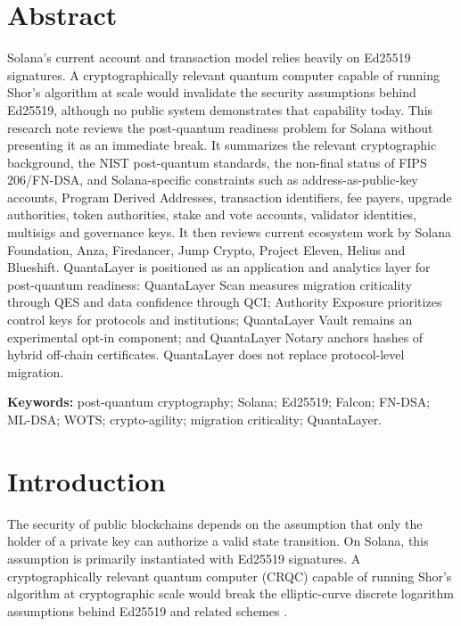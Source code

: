 \documentclass[11pt,a4paper,oneside,parskip=false]{scrartcl}
\newcommand{\QES}{\textsc{QES}}
\newcommand{\QCI}{\textsc{QCI}}
\begin{document}
\clearpage

\section*{Abstract}
{
\small
\noindent
Solana's current account and transaction model relies heavily on Ed25519 signatures. A cryptographically relevant quantum computer capable of running Shor's algorithm at scale would invalidate the security assumptions behind Ed25519, although no public system demonstrates that capability today. This research note reviews the post-quantum readiness problem for Solana without presenting it as an immediate break. It summarizes the relevant cryptographic background, the NIST post-quantum standards, the non-final status of FIPS 206/FN-DSA, and Solana-specific constraints such as address-as-public-key accounts, Program Derived Addresses, transaction identifiers, fee payers, upgrade authorities, token authorities, stake and vote accounts, validator identities, multisigs and governance keys. It then reviews current ecosystem work by Solana Foundation, Anza, Firedancer, Jump Crypto, Project Eleven, Helius and Blueshift. QuantaLayer is positioned as an application and analytics layer for post-quantum readiness: QuantaLayer Scan measures migration criticality through \QES{} and data confidence through \QCI{}; Authority Exposure prioritizes control keys for protocols and institutions; QuantaLayer Vault remains an experimental opt-in component; and QuantaLayer Notary anchors hashes of hybrid off-chain certificates. QuantaLayer does not replace protocol-level migration.
\par
}

\noindent\textbf{Keywords:} post-quantum cryptography; Solana; Ed25519; Falcon; FN-DSA; ML-DSA; WOTS; crypto-agility; migration criticality; QuantaLayer.

\vspace{2mm}
{\footnotesize\setlength{\parskip}{0pt}\tableofcontents}
\clearpage

\section{Introduction}

The security of public blockchains depends on the assumption that only the holder of a private key can authorize a valid state transition. On Solana, this assumption is primarily instantiated with Ed25519 signatures. A cryptographically relevant quantum computer (CRQC) capable of running Shor's algorithm at cryptographic scale would break the elliptic-curve discrete logarithm assumptions behind Ed25519 and related schemes \cite{shor1997,rfc8032}.
\end{document}
